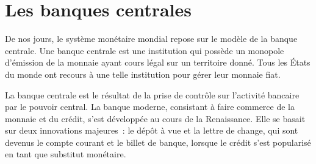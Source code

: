 
%
%

\section*{Les banques centrales}

De nos jours, le système monétaire mondial repose sur le modèle de la banque centrale. Une banque centrale est une institution qui possède un monopole d'émission de la monnaie ayant cours légal sur un territoire donné. Tous les États du monde ont recours à une telle institution pour gérer leur monnaie fiat.

La banque centrale est le résultat de la prise de contrôle sur l'activité bancaire par le pouvoir central. La banque moderne, consistant à faire commerce de la monnaie et du crédit, s'est développée au cours de la Renaissance. Elle se basait sur deux innovations majeures~: le dépôt à vue et la lettre de change, qui sont devenus le compte courant et le billet de banque, lorsque le crédit s'est popularisé en tant que substitut monétaire.

